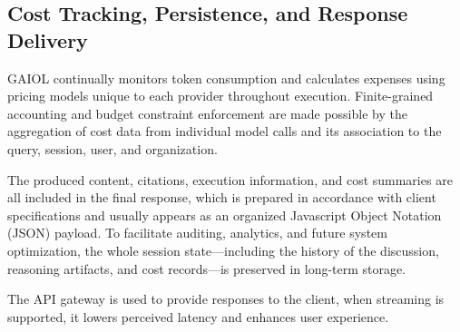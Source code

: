 \documentclass[final,5p,times,twocolumn,authoryear,draft]{elsarticle}
\begin{document}

\subsection{Cost Tracking, Persistence, and Response Delivery}

GAIOL continually monitors token consumption and calculates expenses using pricing models unique to each provider throughout execution. Finite-grained accounting and budget constraint enforcement are made possible by the aggregation of cost data from individual model calls and its association to the query, session, user, and organization.

The produced content, citations, execution information, and cost summaries are all included in the final response, which is prepared in accordance with client specifications and usually appears as an organized Javascript Object Notation (JSON) payload. To facilitate auditing, analytics, and future system optimization, the whole session state—including the history of the discussion, reasoning artifacts, and cost records—is preserved in long-term storage.

The API gateway is used to provide responses to the client, when streaming is supported, it lowers perceived latency and enhances user experience.


\end{document}
